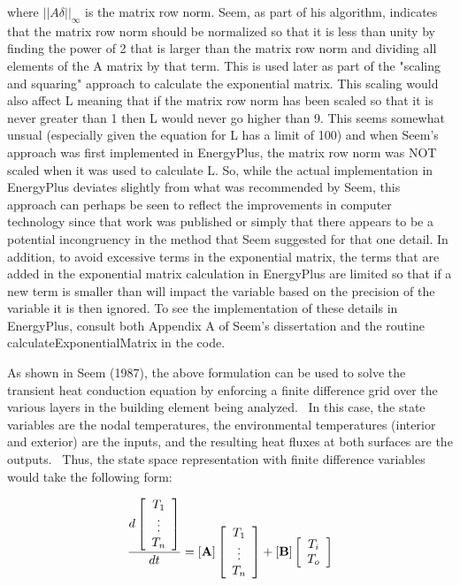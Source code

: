 where \(||A \delta||_\infty\) is the matrix row norm.  Seem, as part of his algorithm, indicates that the matrix row norm should be normalized so that it is less than unity by finding the power of 2 that is larger than the matrix row norm and dividing all elements of the A matrix by that term.  This is used later as part of the "scaling and squaring" approach to calculate the exponential matrix.  This scaling would also affect L meaning that if the matrix row norm has been scaled so that it is never greater than 1 then L would never go higher than 9.  This seems somewhat unsual (especially given the equation for L has a limit of 100) and when Seem's approach was first implemented in EnergyPlus, the matrix row norm was NOT scaled when it was used to calculate L.  So, while the actual implementation in EnergyPlus deviates slightly from what was recommended by Seem, this approach can perhaps be seen to reflect the improvements in computer technology since that work was published or simply that there appears to be a potential incongruency in the method that Seem suggested for that one detail.  In addition, to avoid excessive terms in the exponential matrix, the terms that are added in the exponential matrix calculation in EnergyPlus are limited so that if a new term is smaller than will impact the variable based on the precision of the variable it is then ignored.  To see the implementation of these details in EnergyPlus, consult both Appendix A of Seem's dissertation and the routine calculateExponentialMatrix in the code.

As shown in Seem (1987), the above formulation can be used to solve the transient heat conduction equation by enforcing a finite difference grid over the various layers in the building element being analyzed.~ In this case, the state variables are the nodal temperatures, the environmental temperatures (interior and exterior) are the inputs, and the resulting heat fluxes at both surfaces are the outputs.~ Thus, the state space representation with finite difference variables would take the following form:

\begin{equation}
\frac{d\left[\begin{array}{c}T_1 \\ \vdots \\ T_n\end{array}\right]}{dt} = \left[\bf{A}\right]\left[\begin{array}{c}T_1 \\ \vdots \\ T_n\end{array}\right]+\left[\bf{B}\right]\left[\begin{array}{c}T_i \\ T_o\end{array}\right]
\end{equation}

